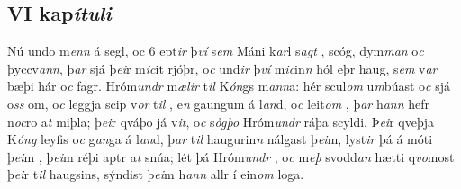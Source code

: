 \beginnumbering \pstart  
\vspace{5mm}\subsection*{VI kap\textit{ítuli}} 
Nú undo m\textit{enn} á segl, oc    6   ept\textit{ir} þ\textit{ví} s\textit{em} Máni k\textit{ar}l   s\textit{agt} ,  
   scóg, dym\textit{m}\textit{an} o\textit{c} þyccv\textit{an}\textit{n},
þ\textit{ar} sjá þ\textit{ei}r m\textit{ic}it  rjóþr, o\textit{c}  und\textit{ir} þ\textit{ví} m\textit{ic}in\textit{n}   hól eþr haug, s\textit{em} v\textit{ar} bæþi  hár o\textit{c} fagr. 
Hró\-m\textit{undr} m\textit{ælir} t\textit{il} K\textit{ón}gs m\textit{ann}a: 
hér scul\textit{om}  u\textit{m}búast o\textit{c} sjá o\textit{ss} om, o\textit{c} leggja scip v\textit{or} t\textit{il} , 
e\textit{n} gaungum á
l\textit{an}d, o\textit{c} leit\textit{om} , þ\textit{ar} h\textit{ann} hefr n\textit{oc}ro a\textit{t}  miþla;  þ\textit{ei}r
qváþo já v\textit{it}, o\textit{c} s\textit{ỏgþo} Hróm\textit{undr} ráþa scyldi.
Þ\textit{ei}r qveþja  K\textit{óng} leyfis o\textit{c}
g\textit{an}ga á l\textit{an}d, þ\textit{ar} t\textit{il} haugurin\textit{n}
nálgast þ\textit{ei}m,  lyst\textit{ir} þá á móti þ\textit{ei}m   ,   þ\textit{ei}m réþi aptr  a\textit{t} snúa; lét þá Hróm\textit{undr}  ,  o\textit{c} m\textit{eþ} svodd\textit{an} hætti
q\textit{vo}most þ\textit{ei}r t\textit{il} haugsins, sýndist þ\textit{ei}m 
h\textit{ann}  allr í ein\textit{om} loga. 
